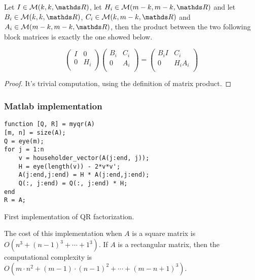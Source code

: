 \documentclass[ComputationalMathematics.tex]{subfiles}
\begin{document}
\begin{theorem}
  Let $I \in \mathcal{M}(k, k, \R)$, let $H_{i} \in \mathcal{M}(m-k, m-k, \R)$ and let $B_{i} \in \mathcal{M}(k, k, \R)$, $C_{i} \in \mathcal{M}(k, m-k, \R)$ and $A_{i} \in \mathcal{M}(m-k, m-k, \R)$, then the product between the two following block matrices is exactly the one showed below.

\[\begin{pmatrix}
    I & 0\\
    0 & H_{i}\\
  \end{pmatrix} 
  \begin{pmatrix}
    B_{i} & C_{i}\\
    0 & A_{i}\\
  \end{pmatrix}
  = 
  \begin{pmatrix}
    B_{i}I & C_{i}\\
    0 & H_{i} A_{i}\\
  \end{pmatrix}
\]
\end{theorem}

\begin{proof}
  It's trivial computation, using the definition of matrix product.
\end{proof}

\subsubsection{Matlab implementation}

\begin{center}
\begin{minipage}{.9\linewidth}
\begin{algorithm}[H]
\begin{verbatim}
function [Q, R] = myqr(A)
[m, n] = size(A);
Q = eye(m);
for j = 1:n
    v = householder_vector(A(j:end, j));
    H = eye(length(v)) - 2*v*v';
    A(j:end,j:end) = H * A(j:end,j:end);
    Q(:, j:end) = Q(:, j:end) * H;
end
R = A;
\end{verbatim}
  \label{alg:26ottQR1}
\caption{First implementation of QR factorization.}
\end{algorithm}
\end{minipage}
\end{center}

\begin{proposition}
  The cost of this implementation when $A$ is a square matrix is $O(n^{3} + {(n-1)}^{3} + \cdots + 1^{3})$. If $A$ is a rectangular matrix, then the computational complexity is $O(m \cdot n^{2} + {(m-1) \cdot (n-1)}^{2} + \cdots + {(m - n + 1)}^{3})$.
\end{proposition}
\end{document}
